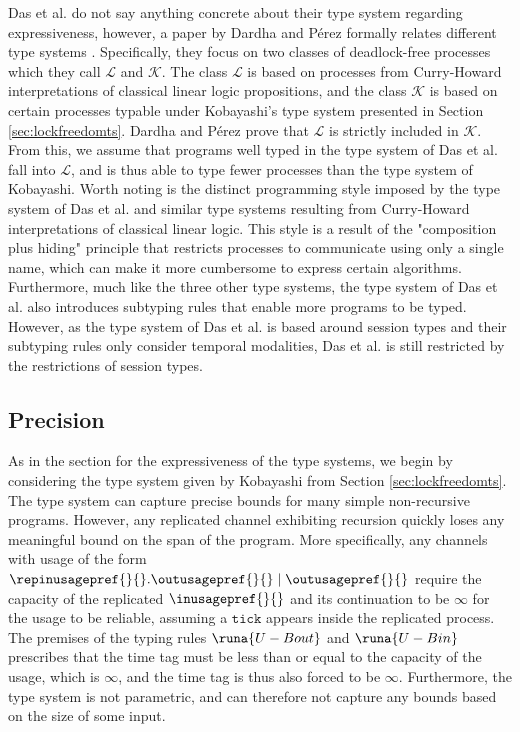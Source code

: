 Das et al. do not say anything concrete about their type system regarding expressiveness, however, a paper by Dardha and Pérez formally relates different type systems \cite{DardhaPerezComparison}. Specifically, they focus on two classes of deadlock-free processes which they call $\mathcal{L}$ and $\mathcal{K}$. The class $\mathcal{L}$ is based on processes from Curry-Howard interpretations of classical linear logic propositions, and the class $\mathcal{K}$ is based on certain processes typable under Kobayashi's type system presented in Section \ref{sec:lockfreedomts}. Dardha and Pérez prove that $\mathcal{L}$ is strictly included in $\mathcal{K}$. From this, we assume that programs well typed in the type system of Das et al. fall into $\mathcal{L}$, and is thus able to type fewer processes than the type system of Kobayashi. Worth noting is the distinct programming style imposed by the type system of Das et al. and similar type systems resulting from Curry-Howard interpretations of classical linear logic. This style is a result of the "composition plus hiding" principle \cite{DardhaPerezComparison} that restricts processes to communicate using only a single name, which can make it more cumbersome to express certain algorithms.\\

Furthermore, much like the three other type systems, the type system of Das et al. also introduces subtyping rules that enable more programs to be typed. However, as the type system of Das et al. is based around session types and their subtyping rules only consider temporal modalities, Das et al. is still restricted by the restrictions of session types.


\subsection{Precision}
As in the section for the expressiveness of the type systems, we begin by considering the type system given by Kobayashi from Section \ref{sec:lockfreedomts}. The type system can capture precise bounds for many simple non-recursive programs. However, any replicated channel exhibiting recursion quickly loses any meaningful bound on the span of the program. More specifically, any channels with usage of the form $\repinusagepref{}{}.\outusagepref{}{} \mid \outusagepref{}{}$ require the capacity of the replicated $\inusagepref{}{}$ and its continuation to be $\infty$ for the usage to be reliable, assuming a $\texttt{tick}$ appears inside the replicated process. The premises of the typing rules $\runa{U-Bout}$ and $\runa{U-Bin}$ prescribes that the time tag must be less than or equal to the capacity of the usage, which is $\infty$, and the time tag is thus also forced to be $\infty$. Furthermore, the type system is not parametric, and can therefore not capture any bounds based on the size of some input.\\

